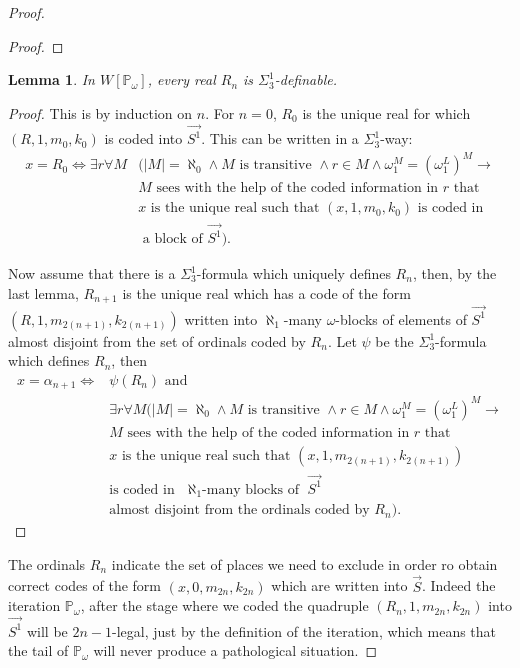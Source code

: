 \documentclass[a4paper,11pt]{article}
\newtheorem{lemma}[theorem]{Lemma}
\newcommand{\forceP}{\mathbb{P}}
\begin{document}
\begin{proof}
\begin{proof}
\end{proof}
\begin{lemma}
In $W[\forceP_{\omega}]$, every real  $R_{n}$ is $\Sigma^1_3$-definable.
\end{lemma}
\begin{proof}
This is by induction on $n$. For $n=0$, $R_0$ is the unique real  for which $(R,1,m_0,k_0)$ is coded into $\vec{S^1}$.
This can be written in a $\Sigma^1_3$-way:
\begin{align*}
x= R_0 \Leftrightarrow \exists r \forall M &(|M|=\aleph_0 \land M \text{ is transitive } \land r \in M \land \omega_1^M=(\omega_1^L)^M \rightarrow \\&M \text{ sees with the help of the coded information in } r \text{ that }\\& x \text{ is the unique real such that } (x,1,m_0,k_0) \text{ is coded in} \\& \text{ a block of } \vec{S^1}).
\end{align*}

Now assume that there is a $\Sigma ^1_3$-formula which uniquely defines $R_{n}$, then, by the last lemma, $R_{n+1}$ is the unique real which has a code of the form $(R,1,m_{2(n+1)},k_{2(n+1)})$ written into $\aleph_1$-many $\omega$-blocks of elements of $\vec{S^1}$ almost disjoint from the set of ordinals coded by $R_n$. Let $\psi$ be the $\Sigma^1_3$-formula which defines $R_{n}$, then
\begin{align*}
x= \alpha_{n+1} \Leftrightarrow  &\psi(R_{n}) \text{ and } \\ &\exists r \forall M (|M|=\aleph_0 \land M \text{ is transitive } \land r \in M \land \omega_1^M=(\omega_1^L)^M \rightarrow \\&M \text{ sees with the help of the coded information in } r \text{ that }\\& x \text{ is the unique real such that } (x,1,m_{2(n+1)},k_{2(n+1)}) \\& \text{is coded in} \text{ $\aleph_1$-many blocks of } \vec{S^1} \\& \text{almost disjoint from the ordinals coded by }  R_{n}).
\end{align*}

\end{proof}
The ordinals $R_{n}$ indicate the set of places we need to exclude in order ro obtain correct codes of the form $(x,0,m_{2n},k_{2n})$ which are written into $\vec{S}$. Indeed the iteration $\forceP_{\omega}$, after the stage where we coded the quadruple $(R_{n},1,m_{2n},k_{2n})$ into $\vec{S^1}$ will be $2n-1$-legal, just by the definition of the iteration, which means that the tail of $\forceP_{\omega}$ will never produce a pathological situation.


\end{proof}
\end{document}
